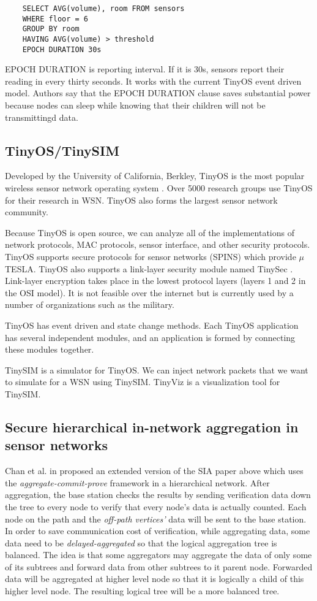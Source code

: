 \documentclass[a4paper]{article}
\begin{document}
\begin{verbatim}
	SELECT AVG(volume), room FROM sensors
	WHERE floor = 6
	GROUP BY room
	HAVING AVG(volume) > threshold
	EPOCH DURATION 30s
\end{verbatim}

EPOCH DURATION is reporting interval. If it is 30s, sensors report their
reading in every thirty seconds. It works with the current TinyOS event driven
model. Authors say that the EPOCH DURATION clause saves substantial power
because nodes can sleep while knowing that their children will not be
transmittingd data.

\subsection{TinyOS/TinySIM}
Developed by the University of California, Berkley, TinyOS is the most popular
wireless sensor network operating system \cite{TinyOS}. Over 5000 research
groups use TinyOS for their research in WSN. TinyOS also forms the largest
sensor network community.

Because TinyOS is open source, we can analyze all of the implementations of
network protocols, MAC protocols, sensor interface, and other security
protocols.  TinyOS supports secure protocols for sensor networks (SPINS) which
provide $\mu$TESLA. TinyOS also supports a link-layer security module named
TinySec \cite{Karlof04}.  Link-layer encryption takes place in the lowest
protocol layers (layers 1 and 2 in the OSI model). It is not feasible over the
internet but is currently used by a number of organizations such as the
military.

TinyOS has event driven and state change methods. Each TinyOS application has
several independent modules, and an application is formed by connecting these
modules together.

TinySIM is a simulator for TinyOS. We can inject network packets that we want
to simulate for a WSN using TinySIM. TinyViz is a visualization tool for
TinySIM.

\subsection{Secure hierarchical in-network aggregation in sensor networks}

Chan et al. in \cite{Chan06} proposed an extended version of the SIA paper
above which uses the {\em aggregate-commit-prove} framework in a hierarchical
network. After aggregation, the base station checks the results by sending
verification data down the tree to every node to verify that every node's data
is actually counted. Each node on the path and the {\em off-path vertices'}
data will be sent to the base station.  In order to save communication cost of
verification, while aggregating data, some data need to be {\em
  delayed-aggregated} so that the logical aggregation tree is balanced.  The
idea is that some aggregators may aggregate the data of only some of its
subtrees and forward data from other subtrees to it parent node. Forwarded
data will be aggregated at higher level node so that it is logically a child
of this higher level node. The resulting logical tree will be a more balanced
tree.
\end{document}
